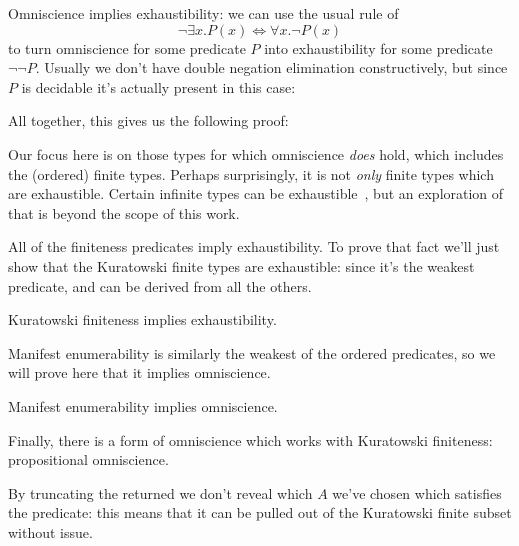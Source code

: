 Omniscience implies exhaustibility: we can use the usual rule of 
\begin{equation}
  \neg \exists x. P(x) \iff \forall x. \neg P(x)
\end{equation}
to turn omniscience for some predicate \(P\) into exhaustibility for some
predicate \(\neg \neg P\).
Usually we don't have double negation elimination constructively, but since
\(P\) is decidable it's actually present in this case:
\begin{agdalisting}
\end{agdalisting}
All together, this gives us the following proof:
\begin{agdalisting}
\end{agdalisting}

Our focus here is on those types for which omniscience \emph{does} hold,
which includes the (ordered) finite types.
Perhaps surprisingly, it is not \emph{only} finite types which are exhaustible.
Certain infinite types can be
exhaustible~\cite{escardoInfiniteSetsThat2007}, but an exploration of that is
beyond the scope of this work.

All of the finiteness predicates imply exhaustibility.
To prove that fact we'll just show that the Kuratowski finite types are
exhaustible: since it's the weakest predicate, and can be derived from all the
others.
\begin{lemma}
  Kuratowski finiteness implies exhaustibility.
\end{lemma} 
Manifest enumerability is similarly the weakest of the ordered predicates, so we
will prove here that it implies omniscience.
\begin{lemma}
  Manifest enumerability implies omniscience.
\end{lemma} 

Finally, there is a form of omniscience which works with Kuratowski finiteness:
propositional omniscience.
\begin{agdalisting}
\end{agdalisting}
By truncating the returned \AgdaDatatype{\ensuremath{\Sigma}} we don't reveal
which \(A\) we've chosen which satisfies the predicate: this means that it can
be pulled out of the Kuratowski finite subset without issue.
\begin{agdalisting}
\end{agdalisting}

